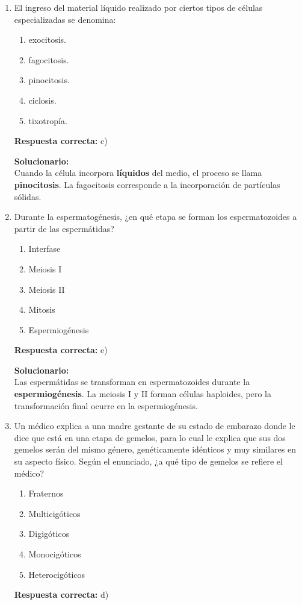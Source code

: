 \begin{enumerate}
	Por ello, la alternativa correcta es la c).
	
	\vspace{6mm}
	
	\item El ingreso del material líquido realizado por ciertos tipos de células especializadas se denomina:
	\begin{enumerate}[label=\alph*)]
		\item exocitosis.
		\item fagocitosis.
		\item pinocitosis.
		\item ciclosis.
		\item tixotropía.
	\end{enumerate}
	\textbf{Respuesta correcta:} c)
	
	\vspace{2mm}
	\textbf{Solucionario:}\\
	Cuando la célula incorpora \textbf{líquidos} del medio, el proceso se llama \textbf{pinocitosis}.  
	La fagocitosis corresponde a la incorporación de partículas sólidas.
	
	\vspace{6mm}
	
	\item Durante la espermatogénesis, ¿en qué etapa se forman los espermatozoides a partir de las espermátidas?
	\begin{enumerate}[label=\alph*)]
		\item Interfase
		\item Meiosis I
		\item Meiosis II
		\item Mitosis
		\item Espermiogénesis
	\end{enumerate}
	\textbf{Respuesta correcta:} e)
	
	\vspace{2mm}
	\textbf{Solucionario:}\\
	Las espermátidas se transforman en espermatozoides durante la \textbf{espermiogénesis}.  
	La meiosis I y II forman células haploides, pero la transformación final ocurre en la espermiogénesis.
	
	\vspace{6mm}
	\item Un médico explica a una madre gestante de su estado de embarazo donde le dice que está en una etapa de gemelos, para lo cual le explica que sus dos gemelos serán del mismo género, genéticamente idénticos y muy similares en su aspecto físico. Según el enunciado, ¿a qué tipo de gemelos se refiere el médico?
	\begin{enumerate}[label=\alph*)]
		\item Fraternos
		\item Multicigóticos
		\item Digigóticos
		\item Monocigóticos
		\item Heterocigóticos
	\end{enumerate}
	\textbf{Respuesta correcta:} d)
	

\end{enumerate}
